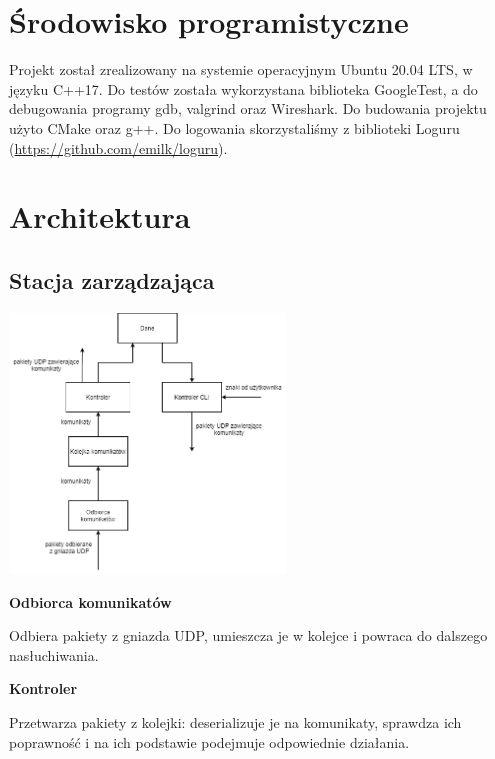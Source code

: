 \documentclass[12pt, a4paper]{article}
\begin{document}
\hypertarget{ux15brodowisko-programistyczne}{%
\section{Środowisko programistyczne}\label{ux15brodowisko-programistyczne}}

Projekt został zrealizowany na systemie operacyjnym Ubuntu 20.04 LTS,
w języku C++17. Do testów została wykorzystana biblioteka GoogleTest, a
do debugowania programy gdb, valgrind oraz Wireshark. Do budowania
projektu użyto CMake oraz g++. Do logowania skorzystaliśmy z
biblioteki Loguru (\href{https://github.com/emilk/loguru}{https://github.com/emilk/loguru}).

\hypertarget{architektura}{%
\section{Architektura}\label{architektura}}

\hypertarget{stacja-zarzux105dzajux105ca-1}{%
\subsection{Stacja zarządzająca}\label{stacja-zarzux105dzajux105ca-1}}

\begin{center}
\includegraphics[width=0.55\textwidth]{server_arch.png}
\end{center}

\textbf{Odbiorca komunikatów}

Odbiera pakiety z gniazda UDP, umieszcza je w kolejce i powraca do dalszego nasłuchiwania.

\textbf{Kontroler}

Przetwarza pakiety z kolejki: deserializuje je na komunikaty, sprawdza ich poprawność i na ich podstawie podejmuje odpowiednie działania.
\end{document}
